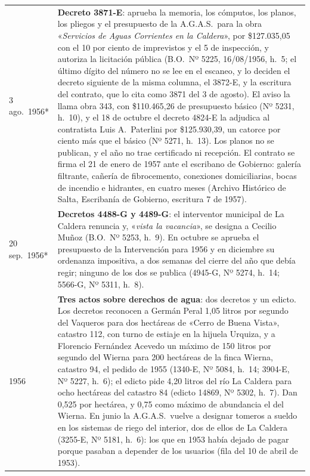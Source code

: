 \begin{longtable}{@{}p{2.7cm}p{10.3cm}@{}}
3 ago.\ 1956* & \textbf{Decreto 3871-E}: aprueba la memoria, los cómputos, los planos, los pliegos y el presupuesto de la A.G.A.S.\ para la obra «\textit{Servicios de Aguas Corrientes en la Caldera}», por \$127.035,05 con el 10 por ciento de imprevistos y el 5 de inspección, y autoriza la licitación pública (B.O.\ Nº 5225, 16/08/1956, h.\ 5; el último dígito del número no se lee en el escaneo, y lo deciden el decreto siguiente de la misma columna, el 3872-E, y la escritura del contrato, que lo cita como 3871 del 3 de agosto). El aviso la llama obra 343, con \$110.465,26 de presupuesto básico (Nº 5231, h.\ 10), y el 18 de octubre el decreto 4824-E la adjudica al contratista Luis A.\ Paterlini por \$125.930,39, un catorce por ciento más que el básico (Nº 5271, h.\ 13). Los planos no se publican, y el año no trae certificado ni recepción. El contrato se firma el 21 de enero de 1957 ante el escribano de Gobierno: galería filtrante, cañería de fibrocemento, conexiones domiciliarias, bocas de incendio e hidrantes, en cuatro meses (Archivo Histórico de Salta, Escribanía de Gobierno, escritura 7 de 1957). \\
20 sep.\ 1956* & \textbf{Decretos 4488-G y 4489-G}: el interventor municipal de La Caldera renuncia y, «\textit{vista la vacancia}», se designa a Cecilio Muñoz (B.O.\ Nº 5253, h.\ 9). En octubre se aprueba el presupuesto de la Intervención para 1956 y en diciembre su ordenanza impositiva, a dos semanas del cierre del año que debía regir; ninguno de los dos se publica (4945-G, Nº 5274, h.\ 14; 5566-G, Nº 5311, h.\ 8). \\
1956 & \textbf{Tres actos sobre derechos de agua}: dos decretos y un edicto. Los decretos reconocen a Germán Peral 1,05 litros por segundo del Vaqueros para dos hectáreas de «Cerro de Buena Vista», catastro 112, con turno de estiaje en la hijuela Urquiza, y a Florencio Fernández Acevedo un máximo de 150 litros por segundo del Wierna para 200 hectáreas de la finca Wierna, catastro 94, el pedido de 1955 (1340-E, Nº 5084, h.\ 14; 3904-E, Nº 5227, h.\ 6); el edicto pide 4,20 litros del río La Caldera para ocho hectáreas del catastro 84 (edicto 14869, Nº 5302, h.\ 7). Dan 0,525 por hectárea, y 0,75 como máximo de abundancia el del Wierna. En junio la A.G.A.S.\ vuelve a designar tomeros a sueldo en los sistemas de riego del interior, dos de ellos de La Caldera (3255-E, Nº 5181, h.\ 6): los que en 1953 había dejado de pagar porque pasaban a depender de los usuarios (fila del 10 de abril de 1953). \\

\end{longtable}
